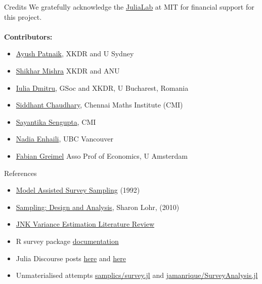 \documentclass{beamer}          %
\begin{document}
\begin{frame}{Credits}
	We gratefully acknowledge the \href{https://julia.mit.edu}{JuliaLab} at MIT for financial support for this project. \\ \\
	\textbf{Contributors:} \\
	\begin{itemize}
	\item \href{https://github.com/ayushpatnaikgit}{Ayush Patnaik}, XKDR and U Sydney
	\item \href{https://github.com/smishr}{Shikhar Mishra} XKDR and ANU
	\item \href{https://github.com/iuliadmtru}{Iulia Dmitru}, GSoc and XKDR, U Bucharest, Romania
	\item \href{https://github.com/codetalker7}{Siddhant Chaudhary}, Chennai Maths Institute (CMI)
	\item \href{https://github.com/sayantikaSSG}{Sayantika Sengupta}, CMI
	\item \href{https://github.com/nadiaenh}{Nadia Enhaili}, UBC Vancouver
	\item \href{https://github.com/greimel}{Fabian Greimel} Asso Prof of Economics, U Amsterdam
	\end{itemize}
\end{frame}


\appendix

\begin{frame}[label=appendix_end]{References}
  \begin{itemize}
  	\item \href{https://www.amazon.com/Assisted-Survey-Sampling-Springer-Statistics/dp/0387406204}{Model Assisted Survey Sampling} (1992)
  	\item \href{https://www.routledge.com/Sampling-Design-and-Analysis/Lohr/p/book/9780367279509}{Sampling: Design and Analysis}, Sharon Lohr, (2010)	
  	\item \href{https://journals.sagepub.com/doi/10.1177/096228029600500305}{JNK Variance Estimation Literature Review}

  	\item R survey package \href{https://r-survey.r-forge.r-project.org/survey/}{documentation}  	
  	\item Julia Discourse posts \href{https://discourse.julialang.org/t/any-package-for-survey-data-analysis/67317}{here} and \href{https://discourse.julialang.org/t/analysis-of-complex-surveys-in-julia/44011}{here}
  	\item Unmaterialised attempts \href{https://github.com/samplics-org/survey.jl}{samplics/survey.jl} and \href{https://github.com/jamanrique/SurveyAnalysis.jl}{jamanrique/SurveyAnalysis.jl}
\end{itemize}
\end{frame}
\end{document}
